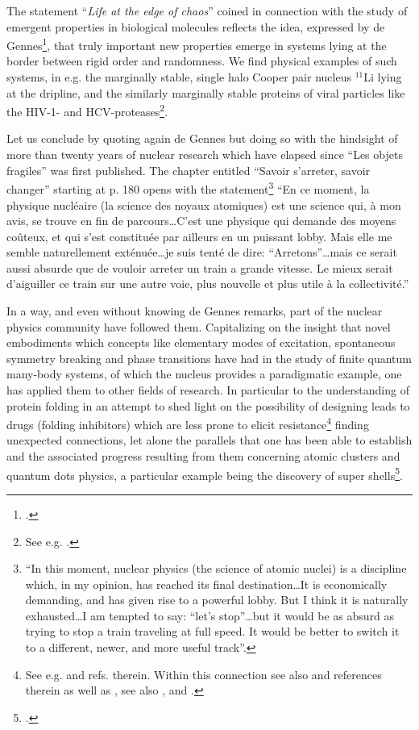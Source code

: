 The statement ``\textit{Life at the edge of chaos}'' coined in connection with the study of emergent properties in biological molecules reflects the idea,  expressed by de Gennes\footnote{\cite{DeGennes:94}.}, that truly important new properties  emerge in systems lying at the border between rigid order and randomness.  We find physical examples of such systems, in e.g. the marginally stable, single  halo Cooper pair nucleus $^{11}$Li lying at the dripline, and the similarly marginally stable proteins of   viral particles like the HIV-1- and HCV-proteases\footnote{See e.g. \cite{Broglia:13b}.}.


 Let us conclude by quoting again de Gennes but doing so with the hindsight of more than twenty years of nuclear research which have elapsed since ``Les objets fragiles'' was first published. The chapter entitled  ``Savoir s'arreter, savoir changer'' starting at p. 180 opens with the statement\footnote{``In this moment, nuclear physics (the science of atomic nuclei) is a discipline which, in my opinion, has reached its final destination\dots It is economically demanding, and has given rise to a powerful lobby. But I think it is naturally exhausted\dots I am tempted to say: ``let's stop''\dots but it would be as absurd as trying to stop a train traveling at full speed. It would be better to switch it to a different, newer, and more useful track''.} ``En ce moment, la physique nucl\'eaire (la science des noyaux atomiques) est une science qui, \`a mon avis, se trouve en fin de parcours\dots C'est une physique qui demande des moyens co\^uteux, et qui s'est constitu\'ee par ailleurs en un puissant lobby. Mais elle me semble naturellement ext\'enu\'ee\dots je suis tent\'e de dire: ``Arretons''\dots mais ce serait aussi absurde que de vouloir arreter un train a grande vitesse. Le mieux serait d'aiguiller ce train sur une autre voie, plus nouvelle et plus utile \`a la collectivit\'e.''


In a way, and even without knowing de Gennes remarks, part of the nuclear physics community have followed them. Capitalizing on the insight that novel embodiments which concepts like elementary modes of excitation, spontaneous symmetry breaking and phase transitions have had in the study of finite quantum many-body systems, of which the nucleus provides a paradigmatic example, one has applied them to other fields of research. In particular to the understanding of protein folding in an attempt to shed light on the possibility of designing leads to  drugs (folding inhibitors) which are less prone to elicit resistance\footnote{See e.g. \cite{Broglia:05,Rosner:17} and refs. therein. Within this connection see also \cite{Bergasa:20} and references therein as well as \cite{Senior:20}, see also \cite{Alva:15}, \cite{Service:20} and \cite{Broglia:01b}.} finding  unexpected connections, let alone  the parallels that one has been able to establish and the associated progress resulting from them concerning atomic clusters  and quantum dots physics, a particular example being the discovery of super shells\footnote{\cite{Pedersen:91,deHeer:87,Brack:93,Pacheco:91,Lipparini:03,Martin:94,Bjornholm:94}.}.







